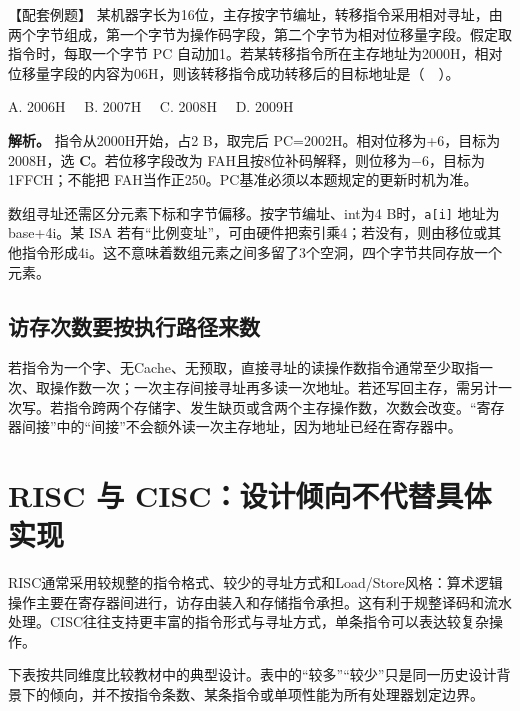 \begin{example}[配套例题]

【配套例题】 某机器字长为16位，主存按字节编址，转移指令采用相对寻址，由两个字节组成，第一个字节为操作码字段，第二个字节为相对位移量字段。假定取指令时，每取一个字节 PC 自动加1。若某转移指令所在主存地址为2000H，相对位移量字段的内容为06H，则该转移指令成功转移后的目标地址是（　）。

A. 2006H　 B. 2007H　 C. 2008H　 D. 2009H

\end{example}

\textbf{解析。} 指令从2000H开始，占2 B，取完后 PC=2002H。相对位移为+6，目标为2008H，选 \textbf{C}。若位移字段改为 FAH且按8位补码解释，则位移为\ensuremath{-}6，目标为1FFCH；不能把 FAH当作正250。PC基准必须以本题规定的更新时机为准。

数组寻址还需区分元素下标和字节偏移。按字节编址、int为4 B时，\texttt{a[\allowbreak{}i]\allowbreak{}} 地址为base+4i。某 ISA 若有``比例变址''，可由硬件把索引乘4；若没有，则由移位或其他指令形成4i。这不意味着数组元素之间多留了3个空洞，四个字节共同存放一个元素。

\subsection{访存次数要按执行路径来数}\label{CO04-06}

若指令为一个字、无Cache、无预取，直接寻址的读操作数指令通常至少取指一次、取操作数一次；一次主存间接寻址再多读一次地址。若还写回主存，需另计一次写。若指令跨两个存储字、发生缺页或含两个主存操作数，次数会改变。``寄存器间接''中的``间接''不会额外读一次主存地址，因为地址已经在寄存器中。

\section{RISC 与 CISC：设计倾向不代替具体实现}\label{CO04-07}

RISC通常采用较规整的指令格式、较少的寻址方式和Load/Store风格：算术逻辑操作主要在寄存器间进行，访存由装入和存储指令承担。这有利于规整译码和流水处理。CISC往往支持更丰富的指令形式与寻址方式，单条指令可以表达较复杂操作。

下表按共同维度比较教材中的典型设计。表中的``较多''``较少''只是同一历史设计背景下的倾向，并不按指令条数、某条指令或单项性能为所有处理器划定边界。


